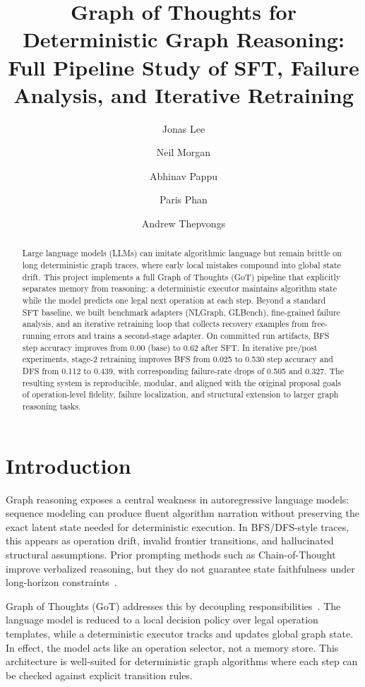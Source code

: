 \documentclass[sigplan,screen]{acmart}
\title{Graph of Thoughts for Deterministic Graph Reasoning:\\Full Pipeline Study of SFT, Failure Analysis, and Iterative Retraining}
\author{Jonas Lee}
\affiliation{\institution{University of Virginia}\city{Charlottesville}\state{Virginia}\country{USA}}
\author{Neil Morgan}
\affiliation{\institution{University of Virginia}\city{Charlottesville}\state{Virginia}\country{USA}}
\author{Abhinav Pappu}
\affiliation{\institution{University of Virginia}\city{Charlottesville}\state{Virginia}\country{USA}}
\author{Paris Phan}
\affiliation{\institution{University of Virginia}\city{Charlottesville}\state{Virginia}\country{USA}}
\author{Andrew Thepvongs}
\affiliation{\institution{University of Virginia}\city{Charlottesville}\state{Virginia}\country{USA}}
\begin{document}
\begin{abstract}
Large language models (LLMs) can imitate algorithmic language but remain brittle on long deterministic graph traces, where early local mistakes compound into global state drift.
This project implements a full Graph of Thoughts (GoT) pipeline that explicitly separates memory from reasoning: a deterministic executor maintains algorithm state while the model predicts one legal next operation at each step.
Beyond a standard SFT baseline, we built benchmark adapters (NLGraph, GLBench), fine-grained failure analysis, and an iterative retraining loop that collects recovery examples from free-running errors and trains a second-stage adapter.
On committed run artifacts, BFS step accuracy improves from 0.00 (base) to 0.62 after SFT.
In iterative pre/post experiments, stage-2 retraining improves BFS from 0.025 to 0.530 step accuracy and DFS from 0.112 to 0.439, with corresponding failure-rate drops of 0.505 and 0.327.
The resulting system is reproducible, modular, and aligned with the original proposal goals of operation-level fidelity, failure localization, and structural extension to larger graph reasoning tasks.
\end{abstract}
\maketitle

\section{Introduction}
Graph reasoning exposes a central weakness in autoregressive language models: sequence modeling can produce fluent algorithm narration without preserving the exact latent state needed for deterministic execution.
In BFS/DFS-style traces, this appears as operation drift, invalid frontier transitions, and hallucinated structural assumptions.
Prior prompting methods such as Chain-of-Thought improve verbalized reasoning, but they do not guarantee state faithfulness under long-horizon constraints~\cite{wei2022cot,liu2023lost}.

Graph of Thoughts (GoT) addresses this by decoupling responsibilities~\cite{got2024,besta2024got}.
The language model is reduced to a local decision policy over legal operation templates, while a deterministic executor tracks and updates global graph state.
In effect, the model acts like an operation selector, not a memory store.
This architecture is well-suited for deterministic graph algorithms where each step can be checked against explicit transition rules.
\end{document}
